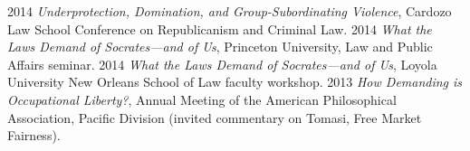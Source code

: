 \documentclass[letterpaper]{moderncv}
\begin{document}
\vspace{1mm}
\cvitem
{2014}
{\textit{Underprotection, Domination, and Group-Subordinating Violence}, Cardozo Law School Conference on Republicanism and Criminal Law.}
\vspace{1mm}
\cvitem
{2014}
{\textit{What the Laws Demand of Socrates---and of Us}, Princeton University, Law and Public Affairs seminar.}
\vspace{1mm}
\cvitem
{2014}
{\textit{What the Laws Demand of Socrates---and of Us}, Loyola University New Orleans School of Law faculty workshop.}
\vspace{1mm}
\cvitem
{2013}
{\textit{How Demanding is Occupational Liberty?}, Annual Meeting of the American Philosophical Association, Pacific Division (invited commentary on Tomasi, Free Market Fairness).}
\vspace{1mm}
\end{document}
